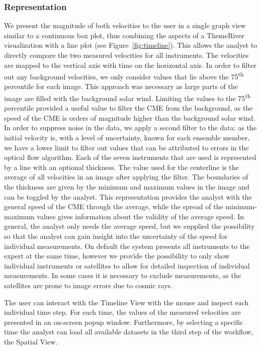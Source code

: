 \documentclass[journal]{vgtc}                %
\begin{document}
\subsubsection{Representation} \label{sec:representation}
We present the magnitude of both velocities to the user in a single graph view similar to a continuous box plot, thus combining the aspects of a ThemeRiver~\cite{havre2002themeriver} visualization with a line plot (see Figure~\ref{fig:timeline}). This allows the analyst to directly compare the two measured velocities for all instruments. The velocities are mapped to the vertical axis with time on the horizontal axis. In order to filter out any background velocities, we only consider values that lie above the 75\textsuperscript{th} percentile for each image. This approach was necessary as large parts of the image are filled with the background solar wind. Limiting the values to the 75\textsuperscript{th} percentile provided a useful value to filter the CME from the background, as the speed of the CME is orders of magnitude higher than the background solar wind. In order to suppress noise in the data, we apply a second filter to the data: as the initial velocity is, with a level of uncertainty, known for each ensemble member, we have a lower limit to filter out values that can be attributed to errors in the optical flow algorithm. Each of the seven instruments that are used is represented by a line with an optional thickness. The value used for the centerline is the average of all velocities in an image after applying the filter. The boundaries of the thickness are given by the minimum and maximum values in the image and can be toggled by the analyst. This representation provides the analyst with the general speed of the CME through the average, while the spread of the minimum-maximum values gives information about the validity of the average speed. In general, the analyst only needs the average speed, but we supplied the possibility so that the analyst can gain insight into the uncertainty of the speed for individual measurements. On default the system presents all instruments to the expert at the same time, however we provide the possibility to only show individual instruments or satellites to allow for detailed inspection of individual measurements. In some cases it is necessary to exclude measurements, as the satellites are prone to image errors due to cosmic rays. 

The user can interact with the Timeline View with the mouse and inspect each individual time step. For each time, the values of the measured velocities are presented in an on-screen popup window. Furthermore, by selecting a specific time the analyst can load all available datasets in the third step of the workflow, the Spatial View.
\end{document}
